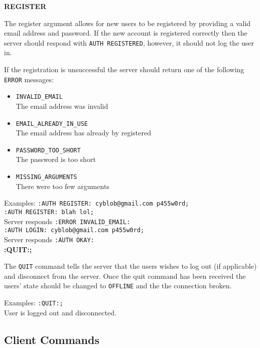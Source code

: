 {\bf REGISTER}

The register argument allows for new users to be registered by providing a valid email address and password. If the new account is registered correctly then the server should respond with \texttt{AUTH REGISTERED}, however, it should not log the user in. 

If the registration is unsuccessful the server should return one of the following \texttt{ERROR} messages:

\begin{itemize}

\item{\texttt{INVALID\_EMAIL} \\
The email address was invalid}

\item{\texttt{EMAIL\_ALREADY\_IN\_USE} \\
The email address has already by registered}

\item{\texttt{PASSWORD\_TOO\_SHORT} \\
The password is too short}

\item{\texttt{MISSING\_ARGUMENTS}	\\
There were too few arguments}

\end{itemize}

Examples:
\texttt{:AUTH REGISTER: cyblob@gmail.com p455w0rd;} \\
\texttt{:AUTH REGISTER: blah lol;} \\
Server responds \texttt{:ERROR INVALID\_EMAIL:} \\
\texttt{:AUTH LOGIN: cyblob@gmail.com p455w0rd;}\\
Server responds \texttt{:AUTH OKAY:} \\

{\bf :QUIT:;}

The \texttt{QUIT} command tells the server that the users wishes to log out (if applicable) and disconnect from the server. Once the quit command has been received the users’ state should be changed to \texttt{OFFLINE} and the the connection broken.

Examples:
\texttt{:QUIT:;} \\
User is logged out and disconnected.

\subsection*{Client Commands}

